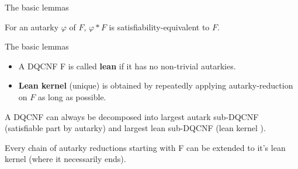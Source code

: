 \documentclass[xcolor=table	]{beamer}
\begin{document}
\begin{frame}{The basic lemmas}
 \begin{lemma}
  For an autarky $\varphi$ of $F$, $\varphi \ast F$ is satisfiability-equivalent to $F$.
 \end{lemma}
{}
\end{frame}

\begin{frame}{The basic lemmas}
 \begin{itemize}
 \item A DQCNF F is called \textbf{lean} if it has no non-trivial autarkies. \newline
 	\pause 
 	
 \item	\textbf{Lean kernel} (unique) is obtained by repeatedly applying autarky-reduction on $F$ as long as possible. \newline
 \end{itemize}
  
 \pause 
  \begin{lemma}
  	A DQCNF can always be decomposed into largest
  	autark sub-DQCNF (satisfiable part by autarky) and largest lean sub-DQCNF (lean kernel ). \newline
  	
 	Every chain of autarky reductions starting
 	with F can be extended \newline to it's lean kernel (where
 	it necessarily ends).
 \end{lemma}
\vspace{0.5cm}
 
\end{frame}
\end{document}
